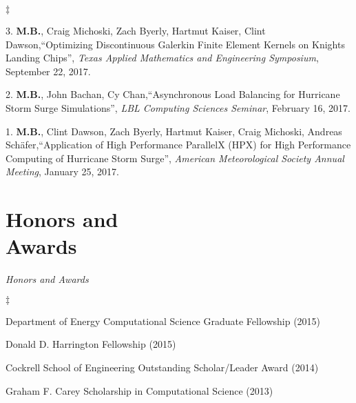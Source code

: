 \documentclass[margin,line]{res}
\newenvironment{list2}{
  \begin{list}{$\ddagger$}{%
      \setlength{\itemsep}{0in}
      \setlength{\parsep}{0in} \setlength{\parskip}{0in}
      \setlength{\topsep}{0in} \setlength{\partopsep}{0in}
      \setlength{\leftmargin}{0.2in}}}{\end{list}}
\newcommand{\talk}[4]{%
#1,``#2'', {\it #3}, #4.%
}
\begin{document}
\begin{resume}
\begin{list2}
\item[3.] \talk{{\bf M.B.}, Craig Michoski, Zach Byerly, Hartmut Kaiser, Clint Dawson}{Optimizing Discontinuous Galerkin Finite Element Kernels on Knights Landing Chips}{Texas Applied Mathematics and Engineering Symposium}{September 22, 2017}

\item[2.] \talk{{\bf M.B.}, John Bachan, Cy Chan}{Asynchronous Load Balancing for Hurricane Storm Surge Simulations}{LBL Computing Sciences Seminar}{February 16, 2017}

\item[1.] \talk{{\bf M.B.}, Clint Dawson, Zach Byerly, Hartmut Kaiser, Craig Michoski, Andreas Sch\"afer}{Application of High Performance ParallelX (HPX) for High Performance Computing of Hurricane Storm Surge}{American Meteorological Society Annual Meeting}{January 25, 2017}
\end{list2}

\section{\sc Honors and \\ Awards}

\textit{Honors and Awards}
\vspace{0.05in}
\begin{list2}
\item[] Department of Energy Computational Science Graduate Fellowship (2015)
\item[] Donald D. Harrington Fellowship (2015)
\item[] Cockrell School of Engineering Outstanding Scholar/Leader Award (2014)
\item[] Graham F. Carey Scholarship in Computational Science (2013)
\end{list2}






\end{resume}
\end{document}
